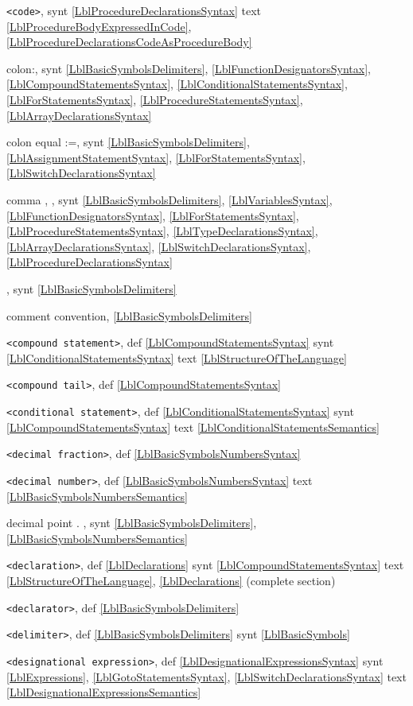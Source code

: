 \documentclass[a4paper,11pt]{article}
\begin{document}
\texttt{<code>},
synt
\ref{LblProcedureDeclarationsSyntax}
text
\ref{LblProcedureBodyExpressedInCode},
\ref{LblProcedureDeclarationsCodeAsProcedureBody}\*

colon:,
synt
\ref{LblBasicSymbolsDelimiters},
\ref{LblFunctionDesignatorsSyntax},
\ref{LblCompoundStatementsSyntax},
\ref{LblConditionalStatementsSyntax},
\ref{LblForStatementsSyntax},
\ref{LblProcedureStatementsSyntax},
\ref{LblArrayDeclarationsSyntax}\*

colon equal :=,
synt
\ref{LblBasicSymbolsDelimiters},
\ref{LblAssignmentStatementSyntax},
\ref{LblForStatementsSyntax},
\ref{LblSwitchDeclarationsSyntax}\*

comma , ,
synt
\ref{LblBasicSymbolsDelimiters},
\ref{LblVariablesSyntax},
\ref{LblFunctionDesignatorsSyntax},
\ref{LblForStatementsSyntax},
\ref{LblProcedureStatementsSyntax},
\ref{LblTypeDeclarationsSyntax},
\ref{LblArrayDeclarationsSyntax},
\ref{LblSwitchDeclarationsSyntax},
\ref{LblProcedureDeclarationsSyntax}\*

,
synt
\ref{LblBasicSymbolsDelimiters}\*

comment convention,
\ref{LblBasicSymbolsDelimiters}\*

\texttt{<compound statement>},
def
\ref{LblCompoundStatementsSyntax}
synt
\ref{LblConditionalStatementsSyntax}
text
\ref{LblStructureOfTheLanguage}\*

\texttt{<compound tail>},
def
\ref{LblCompoundStatementsSyntax}\*

\texttt{<conditional statement>},
def
\ref{LblConditionalStatementsSyntax}
synt
\ref{LblCompoundStatementsSyntax}
text
\ref{LblConditionalStatementsSemantics}\*

\texttt{<decimal fraction>},
def
\ref{LblBasicSymbolsNumbersSyntax}\*

\texttt{<decimal number>},
def
\ref{LblBasicSymbolsNumbersSyntax}
text
\ref{LblBasicSymbolsNumbersSemantics}\*

decimal point . ,
synt
\ref{LblBasicSymbolsDelimiters},
\ref{LblBasicSymbolsNumbersSemantics}\*

\texttt{<declaration>},
def
\ref{LblDeclarations}
synt
\ref{LblCompoundStatementsSyntax}
text
\ref{LblStructureOfTheLanguage},
\ref{LblDeclarations} (complete section)\*

\texttt{<declarator>},
def
\ref{LblBasicSymbolsDelimiters}\*

\texttt{<delimiter>},
def
\ref{LblBasicSymbolsDelimiters}
synt
\ref{LblBasicSymbols}

\texttt{<designational expression>},
def
\ref{LblDesignationalExpressionsSyntax}
synt
\ref{LblExpressions},
\ref{LblGotoStatementsSyntax},
\ref{LblSwitchDeclarationsSyntax}
text
\ref{LblDesignationalExpressionsSemantics}\*
\end{document}
